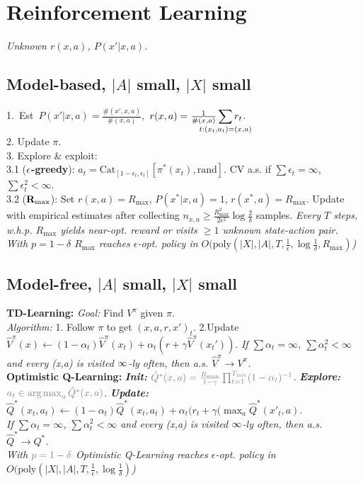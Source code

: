 \section{Reinforcement Learning}
\emph{Unknown $r(x,a)$, $P(x'|x,a)$.}
\subsection{Model-based, $|A|$ small, $|X|$ small}
\mbox{1. Est $P(x'|x,a) = \frac{\#(x',x,a)}{\#(x,a)}$,
$r(x,a) = \frac{1}{\#(x,a)}\smashoperator{\sum_{t:(x_t,a_t)=(x,a)}}r_t$.}\\
2. Update $\pi$.\\
3. Explore \& exploit:\\
3.1 ($\color{black}\mathbf{\epsilon}$\textbf{-greedy}): $a_t=\mathrm{Cat}_{[1-\epsilon_t, \epsilon_t]}[\pi^*(x_t),\mathrm{rand}]$. CV a.s. if $\sum \epsilon_t = \infty$, $\sum \epsilon^2_t < \infty$.\\
3.2 ($\color{black}\mathbf{R_{\max}}$): Set $r(x,a)=R_{\max}$, $P(x^*|x,a)=1$, $r(x^*,a)=R_{\max}$. Update with empirical estimates after collecting $n_{x,a} \geq \frac{R_{\max}^2}{2\epsilon^2}\log\frac{2}{\delta}$ samples. \emph{Every $T$ steps, w.h.p. $R_{\max}$ yields near-opt. reward or visits $\geq 1$ unknown state-action pair.\\}
\emph{With $p=1-\delta$ $R_{\max}$ reaches $\epsilon$-opt. policy in $O(\mathrm{poly}(|X|,|A|,T,\frac{1}{\epsilon},\log\frac{1}{\delta}, R_{\max})$)}
\subsection{Model-free, $|A|$ small, $|X|$ small}
\textbf{TD-Learning:} \emph{Goal:} Find $V^\pi$ given $\pi$.\\
\emph{Algorithm:} 1. Follow $\pi$ to get $(x,a,r,x')_t$. 2.Update $\hat{V}^\pi(x) \leftarrow (1-\alpha_t)\hat{V}^\pi(x_t) + \alpha_t (r + \gamma\hat{V}^\pi(x_t'))$.
\emph{If $\sum\alpha_t=\infty$, $\sum\alpha_t^2<\infty$ and every (x,a) is visited $\color{black}\infty$-ly often, then a.s. $\hat{V}^\pi \to V^\pi$.}\\
\textbf{{\color{gray} Optimistic} Q-Learning:} {\color{gray} \emph{\textbf{Init:}} $\color{gray}\hat{Q}^*(x,a) = \frac{R_{\max}}{1-\gamma}\prod_{t=1}^{T_\mathrm{init}}(1-\alpha_t)^{-1}$}.
\emph{\color{gray}\textbf{Explore:}} $\color{gray}a_t \in \argmax_a \hat{Q}^*(x,a)$. \emph{\textbf{Update:}} $\hat{Q}^*(x_t,a_t) \leftarrow (1-\alpha_t)\hat{Q}^*(x_t,a_t) + \alpha_t(r_t + \gamma(\max_a\hat{Q}^*(x'_t,a)$.\\
\emph{If $\sum\alpha_t=\infty$, $\sum\alpha_t^2<\infty$ and every (x,a) is visited $\color{black}\infty$-ly often, then a.s. $\hat{Q}^* \to Q^*$.}\\
\emph{\color{gray} With $\color{gray}p=1-\delta$ Optimistic Q-Learning reaches $\epsilon$-opt. policy in $O(\mathrm{poly}(|X|,|A|,T,\frac{1}{\epsilon},\log\frac{1}{\delta})$)}
